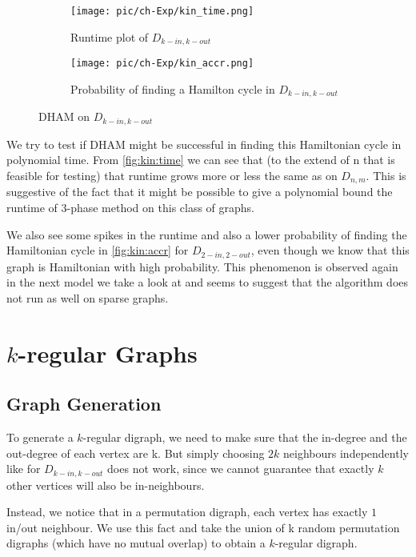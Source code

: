 \begin{figure}[ht]

\begin{subfigure}{\textwidth}
\centering
\texttt{[image: pic/ch-Exp/kin\_time.png]}
\caption{Runtime plot of $D_{k-in, k-out}$}
\label{fig:kin:time}
\end{subfigure}
\begin{subfigure}{\textwidth}
\centering
\texttt{[image: pic/ch-Exp/kin\_accr.png]}
\caption{Probability of finding a Hamilton cycle in $D_{k-in, k-out}$}
\label{fig:kin:accr}
\end{subfigure}

\caption{DHAM on $D_{k-in, k-out}$}
\label{fig:kin:plots}
\end{figure}

We try to test if DHAM might be successful in finding this Hamiltonian cycle in polynomial time.
From \autoref{fig:kin:time} we can see that (to the extend of n that is feasible for testing)
that runtime grows more or less the same as on $D_{n, m}$. This is suggestive of the fact that it might be possible to give a polynomial bound the runtime of 3-phase method on this class of graphs. 

We also see some spikes in the runtime and also a lower probability of finding the Hamiltonian cycle in \autoref{fig:kin:accr} for $D_{2-in, 2-out}$, even though we know that this graph is Hamiltonian with high probability. This phenomenon is observed again in the next model we take a look at and seems to suggest that the algorithm does not run as well on sparse graphs. 


\section{$k$-regular Graphs}
\subsection{Graph Generation}
To generate a $k$-regular digraph, we need to make sure that the in-degree and the out-degree of each vertex are k. But simply choosing $2k$ neighbours independently like for $D_{k-in, k-out}$ does not work, since we cannot guarantee that exactly $k$ other vertices will also be in-neighbours.

Instead, we notice that in a permutation digraph, each vertex has exactly $1$ in/out neighbour. We use this fact and take the union of k random permutation digraphs (which have no mutual overlap) to obtain a $k$-regular digraph.
